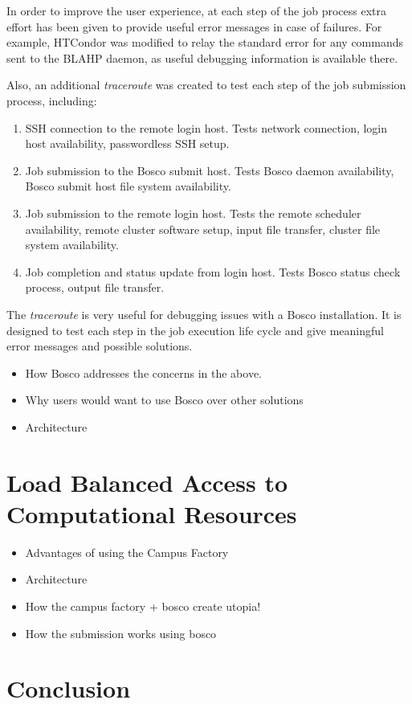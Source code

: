 In order to improve the user experience, at each step of the job process extra effort has been given to provide useful error messages in case of failures.  For example, HTCondor was modified to relay the standard error for any commands sent to the BLAHP daemon, as useful debugging information is available there.  

Also, an additional \emph{traceroute} was created to test each step of the job submission process, including:

\begin{enumerate}
\item SSH connection to the remote login host.  Tests network connection, login host availability, passwordless SSH setup.
\item Job submission to the Bosco submit host.  Tests Bosco daemon availability, Bosco submit host file system availability.
\item Job submission to the remote login host.  Tests the remote scheduler availability, remote cluster software setup, input file transfer, cluster file system availability.
\item Job completion and status update from login host.  Tests Bosco status check process, output file transfer.
\end{enumerate}

The \emph{traceroute} is very useful for debugging issues with a Bosco installation.  It is designed to test each step in the job execution life cycle and give meaningful error messages and possible solutions.

\begin{itemize}
\item How Bosco addresses the concerns in the above.
\item Why users would want to use Bosco over other solutions
\item Architecture
\end{itemize}

\section{Load Balanced Access to Computational Resources}

\begin{itemize}
\item Advantages of using the Campus Factory
\item Architecture
\item How the campus factory + bosco create utopia!
\item How the submission works using bosco
\end{itemize}





\section{Conclusion}



